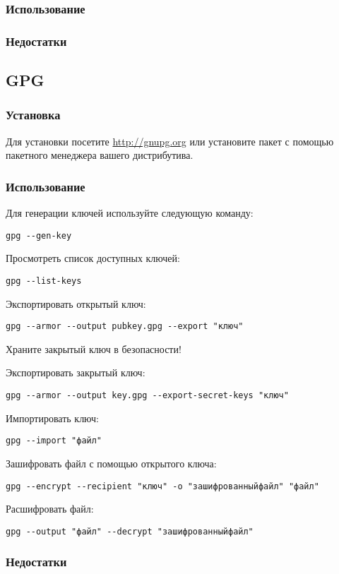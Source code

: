 \subsubsection{Использование}
\subsubsection{Недостатки}
\subsection{GPG}
\subsubsection{Установка}
Для установки посетите \url{http://gnupg.org} или установите пакет с помощью пакетного менеджера вашего дистрибутива.
\subsubsection{Использование}
Для генерации ключей используйте следующую команду:
\begin{lstlisting}
gpg --gen-key
\end{lstlisting}
Просмотреть список доступных ключей:
\begin{lstlisting}
gpg --list-keys
\end{lstlisting}
Экспортировать открытый ключ:
\begin{lstlisting}
gpg --armor --output pubkey.gpg --export "ключ"
\end{lstlisting}
\begin{important}
Храните закрытый ключ в безопасности!
\end{important}
Экспортировать закрытый ключ:
\begin{lstlisting}
gpg --armor --output key.gpg --export-secret-keys "ключ"
\end{lstlisting}
Импортировать ключ:
\begin{lstlisting}
gpg --import "файл"
\end{lstlisting}
Зашифровать файл с помощью открытого ключа:
\begin{lstlisting}
gpg --encrypt --recipient "ключ" -o "зашифрованныйфайл" "файл"
\end{lstlisting}
Расшифровать файл:
\begin{lstlisting}
gpg --output "файл" --decrypt "зашифрованныйфайл"
\end{lstlisting}
\subsubsection{Недостатки}

